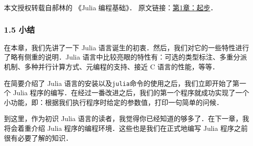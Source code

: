 
本文授权转载自郝林的 《Julia 编程基础》． 原文链接：\href{https://github.com/hyper0x/JuliaBasics/blob/master/book/ch01.md}{第1章：起步}．

\subsubsection{1.5 小结}

在本章，我们先讲了一下 Julia 语言诞生的初衷．然后，我们对它的一些特性进行了略有侧重的说明．Julia 语言中比较亮眼的特性有：可选的类型标注、多重分派机制、多种并行计算方式、元编程的支持、接近 C 语言的性能，等等．

在简要介绍了 Julia 语言的安装以及\verb|julia|命令的使用之后，我们立即开始了第一个 Julia 程序的编写．在经过一番改进之后，我们的第一个程序就成功实现了一个小功能，即：根据我们执行程序时给定的参数值，打印一句简单的问候．

到这里，作为初识 Julia 语言的读者，我觉得你已经知道的够多了．在下一章，我将会着重介绍 Julia 程序的编程环境．这些也是我们在正式地编写 Julia 程序之前很有必要了解的知识．
